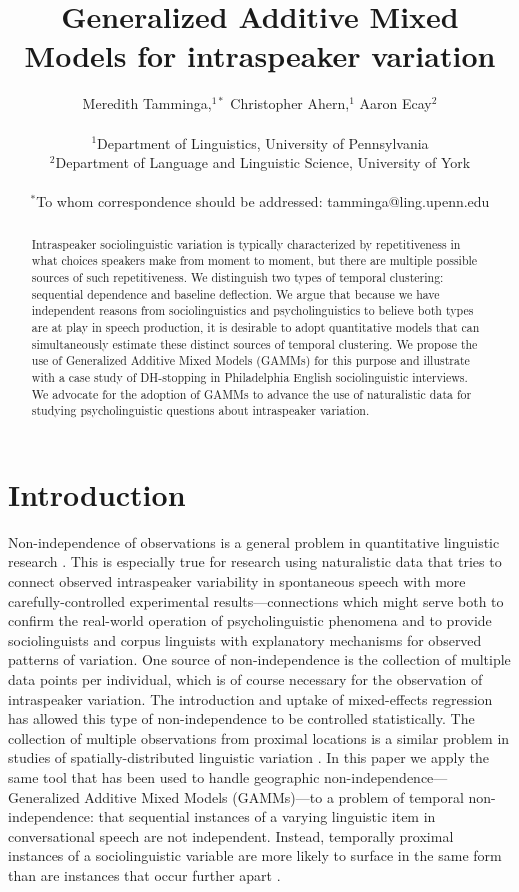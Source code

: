 \documentclass[12pt]{article}
\title{Generalized Additive Mixed Models for intraspeaker variation}
\author
{Meredith Tamminga,$^{1\ast}$ Christopher Ahern,$^{1}$ Aaron Ecay$^{2}$\\
\\
\normalsize{$^{1}$Department of Linguistics, University of Pennsylvania}\\

\normalsize{$^{2}$Department of Language and Linguistic Science, University of York}\\
\\
\normalsize{$^\ast$To whom correspondence should be addressed: tamminga@ling.upenn.edu}
}
\date{}
\begin{document}
 


\baselineskip24pt


\maketitle 

\begin{abstract}
Intraspeaker sociolinguistic variation is typically characterized by repetitiveness in what choices speakers make from moment to moment, but there are multiple possible sources of such repetitiveness. We distinguish two types of temporal clustering: sequential dependence and baseline deflection. We argue that because we have independent reasons from sociolinguistics and psycholinguistics to believe both types are at play in speech production, it is desirable to adopt quantitative models that can simultaneously estimate these distinct sources of temporal clustering. We propose the use of Generalized Additive Mixed Models (GAMMs) for this purpose and illustrate with a case study of DH-stopping in Philadelphia English sociolinguistic interviews. We advocate for the adoption of GAMMs to advance the use of naturalistic data for studying psycholinguistic questions about intraspeaker variation.

\end{abstract}

\section{Introduction} \label{intro}


    
Non-independence of observations is a general problem in quantitative linguistic research \citep{paolillo:2002}. This is especially true for  research using naturalistic data that tries to connect observed intraspeaker variability in spontaneous speech with more carefully-controlled experimental results---connections which might serve both to confirm the real-world operation of psycholinguistic phenomena and to provide sociolinguists and corpus linguists with explanatory mechanisms for  observed patterns of variation. One source of non-independence is the collection of multiple data points per individual, which is of course necessary for the observation of intraspeaker variation. The introduction and uptake of mixed-effects regression \citep{Baayen:2008,Barr:2013} has allowed this type of non-independence to be controlled statistically. The collection of multiple observations from proximal locations is a similar problem in studies of spatially-distributed linguistic variation \citep{Wieling:2014}. In this paper we apply the same tool that has been used to handle geographic non-independence---Generalized Additive Mixed Models (GAMMs)---to a problem of temporal non-independence: that sequential instances of a varying linguistic item in conversational speech are not independent. Instead, temporally proximal instances of a sociolinguistic variable are more likely to surface in the same form than are instances that occur further apart \citep{Sankoff:1978}. 
    
\end{document}
